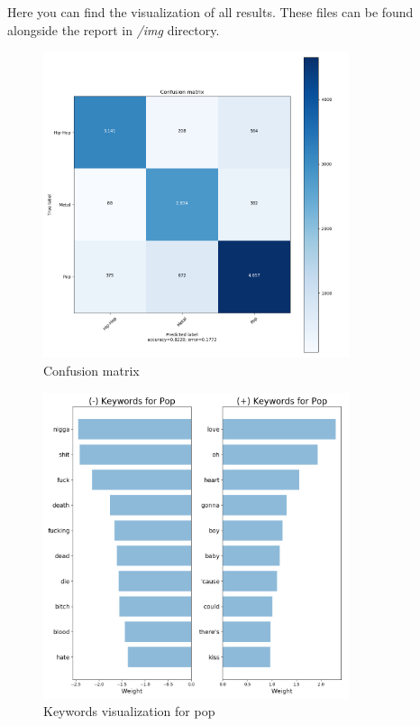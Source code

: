 \documentclass[a4paper,11pt]{article}
\begin{document}
Here you can find the visualization of all results. These files can be found alongside the report in \textit{/img} directory.

\begin{figure}[h]
\begin{center}
\includegraphics[width=0.8\textwidth]{./img/matrix.png}
\end{center}
\caption{Confusion matrix}
\label{label-cf-matrix}
\end{figure}

\begin{figure}[h]
\begin{center}
\includegraphics[width=0.8\textwidth]{./img/pop-keywords.png}
\end{center}
\caption{Keywords visualization for pop}
\label{label-kw-pop}
\end{figure}
\end{document}
